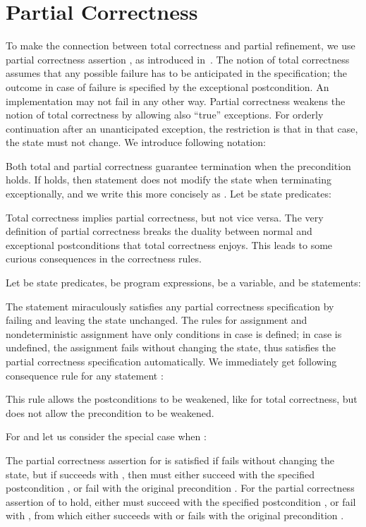 \documentclass[submission,copyright,creativecommons]{eptcs}
\begin{document}
\section{Partial Correctness}
\label{sec:paco}

To make the connection between total correctness and partial refinement, we use partial correctness assertion , as introduced in~\cite{SekerinskiZhang11PartialCorrectness}. The notion of total correctness assumes that any possible failure has to be anticipated in the specification; the outcome in case of failure is specified by the exceptional postcondition. An implementation may not fail in any other way. Partial correctness weakens the notion of total correctness by allowing also ``true'' exceptions. For orderly continuation after an unanticipated exception, the restriction is that in that case, the state must not change. We introduce following notation:

Both total and partial correctness guarantee termination when the precondition holds. If  holds, then statement  does not modify the state when terminating exceptionally, and we write this more concisely as . Let  be state predicates:

Total correctness implies partial correctness, but not vice versa. The very definition of partial correctness breaks the duality between normal and exceptional postconditions that total correctness enjoys. This leads to some curious consequences in the correctness rules.

\begin{theorem} Let  be state predicates,  be program expressions,  be a variable, and  be statements:

\end{theorem}
The  statement miraculously satisfies any partial correctness specification by failing and leaving the state unchanged. The rules for assignment and nondeterministic assignment have only conditions in case  is defined; in case  is undefined, the assignment fails without changing the state, thus satisfies the partial correctness specification automatically. We immediately get following consequence rule for any statement :

This rule allows the postconditions to be weakened, like for total correctness, but does not allow the precondition to be weakened.

For  and  let us consider the special case when :

The partial correctness assertion for  is satisfied if  fails without changing the state, but if  succeeds with , then  must either succeed with the specified postcondition , or fail with the original precondition . For the partial correctness assertion of  to hold, either  must succeed with the specified postcondition , or fail with , from which  either succeeds with  or fails with the original precondition .
\end{document}
